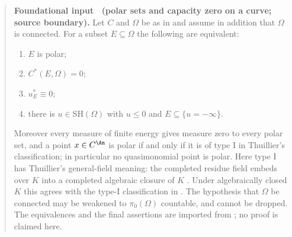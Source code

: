 \label{thm:ch25-thuillier-polar}
\begin{quote}
\textbf{Foundational input \thetheorem\ (polar sets and capacity zero on a
curve; source boundary).}
Let $C$ and $\Omega$ be as in  and
assume in addition that $\Omega$ is connected.  For a subset
$E\subseteq\Omega$ the following are equivalent:
\begin{enumerate}
\item\label{itm:ch25-thupol:polar} $E$ is polar;
\item\label{itm:ch25-thupol:cap} $C^*(E,\Omega)=0$;
\item\label{itm:ch25-thupol:extremal} $u^*_E\equiv0$;
\item\label{itm:ch25-thupol:single} there is $u\in\mathrm{SH}(\Omega)$ with
 $u\leq0$ and $E\subseteq\{u=-\infty\}$.
\end{enumerate}
Moreover every measure of finite energy gives measure zero to every polar
set, and a point $x\in C^{\An}$ is polar if and only if it is of type
$\mathrm{I}$ in Thuillier's classification; in
particular no quasimonomial point is polar.  Here type
$\mathrm{I}$ has Thuillier's general-field meaning: the completed residue
field embeds over $K$ into a completed algebraic closure of $K$
\cite[\S2.1.3, Proposition~3.4.10]{Thu05}.  Under algebraically closed
$K$ this agrees with the type-$\mathrm{I}$ classification in
.  The hypothesis that
$\Omega$ be connected may be weakened to $\pi_0(\Omega)$ countable, and
cannot be dropped.
The equivalences and the final assertions are imported from
\cite[Th\'eor\`eme~3.5.11, Proposition~3.4.10 and
Th\'eor\`eme~3.6.11]{Thu05}; no proof is claimed here.
\end{quote}

